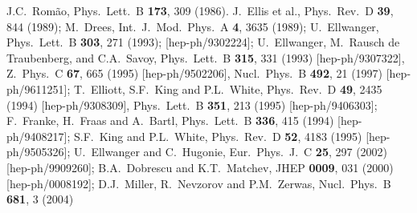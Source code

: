 \documentclass[11pt]{article}
\begin{document}
\begin{thebibliography}{999}
J.C.~Rom\~ao,
  Phys.\ Lett.\ B {\bf 173}, 309 (1986).
J.~Ellis et al., 
  Phys.\ Rev.\ D {\bf 39}, 844 (1989);
M.~Drees,
  Int.\ J.\ Mod.\ Phys.\ A {\bf 4}, 3635 (1989);
U.~Ellwanger,
  Phys.\ Lett.\ B {\bf 303}, 271 (1993);
  [hep-ph/9302224];
U.~Ellwanger, M.~Rausch de Traubenberg, and C.A.~Savoy,
  Phys.\ Lett.\ B {\bf 315}, 331 (1993)
  [hep-ph/9307322],
  Z.\ Phys.\ C {\bf 67}, 665 (1995)
  [hep-ph/9502206],
  Nucl.\ Phys.\ B {\bf 492}, 21 (1997)
  [hep-ph/9611251];
T.~Elliott, S.F.~King and P.L.~White,
  Phys.\ Rev.\ D {\bf 49}, 2435 (1994)
  [hep-ph/9308309],
  Phys.\ Lett.\ B {\bf 351}, 213 (1995)
  [hep-ph/9406303];
F.~Franke, H.~Fraas and A.~Bartl, 
  Phys.\ Lett.\ B {\bf 336}, 415 (1994)
  [hep-ph/9408217];
S.F.~King and P.L.~White, 
  Phys.\ Rev.\ D {\bf 52}, 4183 (1995)
  [hep-ph/9505326];
U.~Ellwanger and C.~Hugonie,
  Eur.\ Phys.\ J.\ C {\bf 25}, 297 (2002)
  [hep-ph/9909260];
B.A.~Dobrescu and K.T.~Matchev,
  JHEP {\bf 0009}, 031 (2000)
  [hep-ph/0008192];
D.J.~Miller, R.~Nevzorov and P.M.~Zerwas,
  Nucl.\ Phys.\ B {\bf 681}, 3 (2004)

\end{thebibliography}
\end{document}
